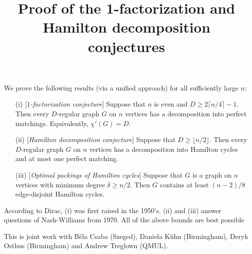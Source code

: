 \title{Proof of the 1-factorization and Hamilton decomposition conjectures}
\endtitle

We prove the following results (via a unified approach) for all sufficiently large $n$:
\begin{itemize}
\item[(i)] [\emph{$1$-factorization conjecture}]
Suppose  that $n$ is even and $D\geq 2\lceil n/4\rceil -1$. 
Then every $D$-regular graph $G$ on $n$ vertices has a decomposition into perfect matchings.
Equivalently, $\chi'(G)=D$.
\item[(ii)] [\emph{Hamilton decomposition conjecture}]
Suppose that $D \ge   \lfloor n/2 \rfloor $.
Then every $D$-regular graph $G$ on $n$ vertices has a decomposition
into Hamilton cycles and at most one perfect matching.
\item[(iii)] [\emph{Optimal packings of Hamilton cycles}] Suppose that $G$ is a graph on $n$ vertices with
minimum degree $\delta\ge n/2$.
Then $G$ contains at least $ (n-2)/8$ edge-disjoint Hamilton cycles.
\end{itemize}
According to Dirac, (i) was first raised in the 1950's.
(ii) and (iii) answer questions of Nash-Williams from 1970.
All of the above bounds are best possible

This is joint work with B\'ela Csaba (Szeged), Daniela K\"uhn (Birmingham), Deryk Osthus (Birmingham) and Andrew Treglown (QMUL).
